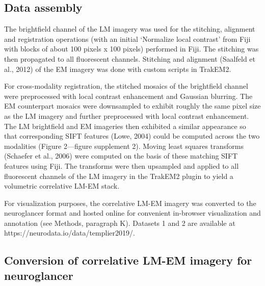 \documentclass{article}
\begin{document}
\subsection*{Data assembly}

The brightfield channel of the LM imagery was used for the stitching, alignment and registration operations (with an initial ‘Normalize local contrast’ from Fiji with blocks of about 100 pixels x 100 pixels) performed in Fiji. The stitching was then propagated to all fluorescent channels. Stitching and alignment (Saalfeld et al., 2012) of the EM imagery was done with custom scripts in TrakEM2.

For cross-modality registration, the stitched mosaics of the brightfield channel were preprocessed with local contrast enhancement and Gaussian blurring. The EM counterpart mosaics were downsampled to exhibit roughly the same pixel size as the LM imagery and further preprocessed with local contrast enhancement. The LM brightfield and EM imageries then exhibited a similar appearance so that corresponding SIFT features (Lowe, 2004) could be computed across the two modalities (Figure 2---figure supplement 2). Moving least squares transforms (Schaefer et al., 2006) were computed on the basis of these matching SIFT features using Fiji. The transforms were then upsampled and applied to all fluorescent channels of the LM imagery in the TrakEM2 plugin to yield a volumetric correlative LM-EM stack.

For visualization purposes, the correlative LM-EM imagery was converted to the neuroglancer format and hosted online for convenient in-browser visualization and annotation (see Methods, paragraph K). Datasets 1 and 2 are available at https://neurodata.io/data/templier2019/.

\subsection*{Conversion of correlative LM-EM imagery for neuroglancer}
\end{document}
